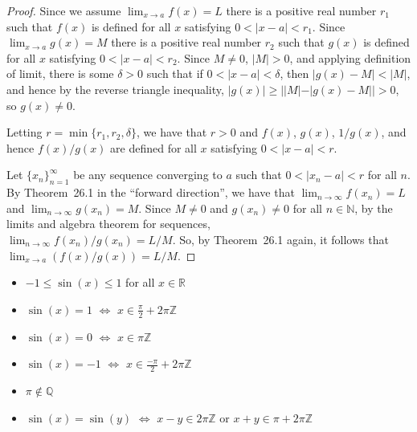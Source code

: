 \documentclass[12pt]{amsart}
\newcommand{\Q}{\mathbb{Q}}
\newcommand{\R}{{\mathbb{R}}}
\newcommand{\Z}{\mathbb{Z}}
\newcommand{\N}{\mathbb{N}}
\numberwithin{equation}{section}
\theoremstyle{plain} %
\theoremstyle{definition}
\theoremstyle{remark}
\begin{document}
\begin{enumerate}
\begin{framed}
\begin{proof}
Since we assume
	${\lim_{x \to a} f(x) = L}$ there is a positive real number $r_1$ such that $f(x)$ is defined for all $x$ satisfying $0 < |x-a| < r_1$.
Since
	$\lim_{x \to a} g(x) = M$ there is a positive real number $r_2$ such that $g(x)$ is defined for all $x$ satisfying $0 < |x-a| < r_2$. Since $M\neq 0$, $|M|>0$, and applying definition of limit, there is some $\delta>0$ such that if $0<|x-a| < \delta$, then $|g(x)-M|<|M|$, and hence by the reverse triangle inequality, $|g(x)| \geq | |M| - |g(x)-M| | >0$, so $g(x)\neq 0$. 
	
	Letting $r = \min\{r_1, r_2,\delta\}$,
	we have that $r > 0$ and $f(x)$, $g(x)$, $1/g(x)$, and hence $f(x)/g(x)$ are defined for all $x$ satisfying $0 < |x-a| < r$. 	
	
	Let $\{x_n\}_{n=1}^\infty$ be any sequence converging to $a$ such that  ${0 < |x_n -a| < r}$ for all $n$. 
	By  Theorem~26.1 in the ``forward direction'', we have that  $\lim_{n \to \infty} f(x_n) = L$ and $\lim_{n \to \infty} g(x_n) = M$. Since $M\neq 0$ and $g(x_n)\neq 0$ for all $n\in \N$, by the limits and algebra theorem for sequences, \\
	${\lim_{n \to \infty} f(x_n) /g(x_n) = L / M}$. 
	So, by  Theorem~26.1 again, it follows that
	$\lim_{x \to a} (f(x) / g(x)) = L / M$.
\end{proof}
\end{framed}

\vfill 

{ \hrulefill
\begin{multicols}{2}
\footnotesize
\begin{itemize}
\item $-1 \leq \sin(x) \leq 1$ for all $x\in \R$
\item $\sin(x) = 1$ $\Longleftrightarrow$ $x\in  \frac{\pi}{2} + 2\pi \Z$ 
\item $\sin(x) = 0$ $\Longleftrightarrow$ $x\in \pi \Z$ 
\item $\sin(x) = -1$ $\Longleftrightarrow$ $x\in  \frac{-\pi}{2} + 2\pi \Z$
\item $\pi \notin \Q$
\item $\sin(x) = \sin(y)$ $\Longleftrightarrow$ $x-y\in 2\pi \Z$ or $x+y\in \pi + 2\pi \Z$
\end{itemize}
\end{multicols}
}
\end{enumerate}

\newpage
\end{document}
